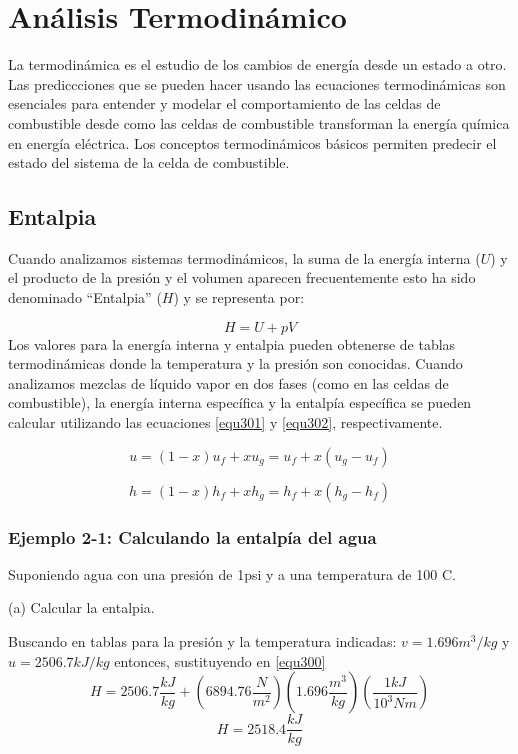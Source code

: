 \documentclass[12pt]{book}
\theoremstyle{definition}
\theoremstyle{remark}
\theoremstyle{plain}
\begin{document}
\chapter{Análisis Termodinámico}
La termodinámica es el estudio de los cambios de energía desde un estado a otro. Las prediccciones
que se pueden hacer usando las ecuaciones termodinámicas son esenciales para entender
y modelar el comportamiento de las celdas de combustible desde como las celdas de combustible
transforman la energía química en energía eléctrica. Los conceptos termodinámicos 
básicos permiten predecir el estado del sistema de la celda de combustible. 

\section{Entalpia}
Cuando analizamos sistemas termodinámicos, la suma de la energía interna ($U$) y el 
producto de la presión y el volumen aparecen frecuentemente esto ha sido denominado 
``Entalpia'' ($H$) y se representa por:

 \begin{equation}
\label{equ300}
  H=U+pV
 \end{equation}
Los valores para la energía interna y entalpia pueden obtenerse de tablas termodinámicas
donde la temperatura y la presión son conocidas. Cuando analizamos mezclas de líquido
vapor en dos fases (como en las celdas de combustible), la energía interna específica
y la entalpía específica se pueden calcular utilizando las ecuaciones \ref{equ301} y 
\ref{equ302}, respectivamente.

\begin{equation}
 \label{equ301}
u = (1-x) u_f+x u_g=u_f+x(u_g-u_f)
\end{equation}

\begin{equation}
 \label{equ302}
h = (1-x) h_f+x h_g=h_f+x(h_g-h_f)
\end{equation}

\subsection{Ejemplo 2-1: Calculando la entalpía del agua}

Suponiendo agua con una presión de 1psi y a una temperatura de 100 C.

(a) Calcular la entalpia.

Buscando en tablas para la presión y la temperatura indicadas: $v=1.696 m^3/kg$ y 
$u=2506.7 kJ/kg$ entonces, sustituyendo en \ref{equ300}
\begin{equation}
 H = 2506.7 \frac{kJ}{kg}+(6894.76 \frac{N}{m^2})(1.696 \frac{m^3}{kg})(\frac{1 kJ}{10^3 N m})
\end{equation}
\begin{equation}
 H=2518.4 \frac{kJ}{kg}
\end{equation}
\end{document}
